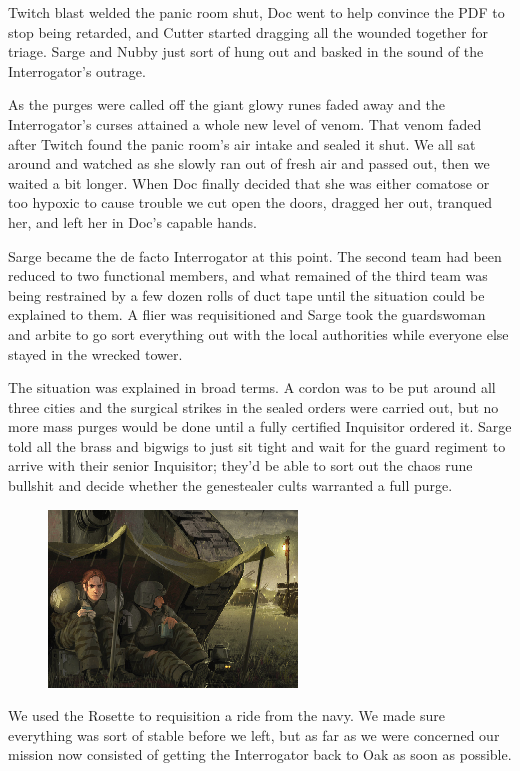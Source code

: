 Twitch blast welded the panic room shut, Doc went to help convince the PDF to stop being retarded, and Cutter started dragging all the wounded together for triage. 
Sarge and Nubby just sort of hung out and basked in the sound of the Interrogator’s outrage.

As the purges were called off the giant glowy runes faded away and the Interrogator’s curses attained a whole new level of venom. 
That venom faded after Twitch found the panic room’s air intake and sealed it shut. 
We all sat around and watched as she slowly ran out of fresh air and passed out, then we waited a bit longer. 
When Doc finally decided that she was either comatose or too hypoxic to cause trouble we cut open the doors, dragged her out, tranqued her, and left her in Doc’s capable hands.

Sarge became the de facto Interrogator at this point. 
The second team had been reduced to two functional members, and what remained of the third team was being restrained by a few dozen rolls of duct tape until the situation could be explained to them. 
A flier was requisitioned and Sarge took the guardswoman and arbite to go sort everything out with the local authorities while everyone else stayed in the wrecked tower.

The situation was explained in broad terms. 
A cordon was to be put around all three cities and the surgical strikes in the sealed orders were carried out, but no more mass purges would be done until a fully certified Inquisitor ordered it. 
Sarge told all the brass and bigwigs to just sit tight and wait for the guard regiment to arrive with their senior Inquisitor; 
they’d be able to sort out the chaos rune bullshit and decide whether the genestealer cults warranted a full purge.

\begin{figure}
	\begin{center}
		\includegraphics[width=\figwidth]{pics/5/40.png}
	\end{center}
\end{figure}
We used the Rosette to requisition a ride from the navy. 
We made sure everything was sort of stable before we left, but as far as we were concerned our mission now consisted of getting the Interrogator back to Oak as soon as possible.

